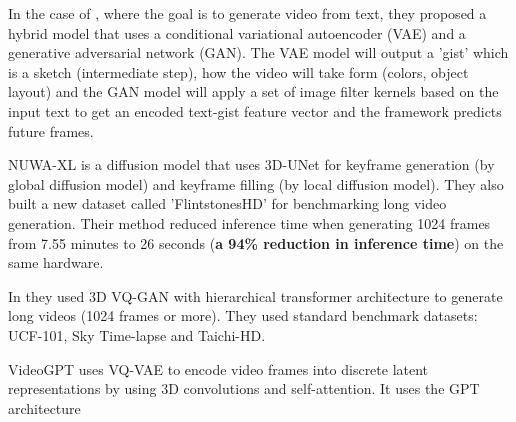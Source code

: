 In the case of \cite{video_generation_from_text}, where the goal is to generate video from text, they proposed a hybrid model that uses a conditional variational autoencoder (VAE) and a generative adversarial network (GAN). The VAE model will output a 'gist' which is a sketch (intermediate step), how the video will take form (colors, object layout) and the GAN model will apply a set of image filter kernels based on the input text to get an encoded text-gist feature vector and the framework predicts future frames.

NUWA-XL \cite{yin2023nuwa} is a diffusion model that uses 3D-UNet for keyframe generation (by global diffusion model) and keyframe filling (by local diffusion model). They also built a new dataset called 'FlintstonesHD' for benchmarking long video generation. Their method reduced inference time when generating 1024 frames from 7.55 minutes to 26 seconds (\textbf{a 94\% reduction in inference time}) on the same hardware.

In \cite{ge2022long} they used 3D VQ-GAN with hierarchical transformer architecture to generate long videos (1024 frames or more). They used standard benchmark datasets: UCF-101, Sky Time-lapse and Taichi-HD.

VideoGPT \cite{videogpt} uses VQ-VAE to encode video frames into discrete latent representations by using 3D convolutions and self-attention. It uses the GPT \cite{gpt} architecture

